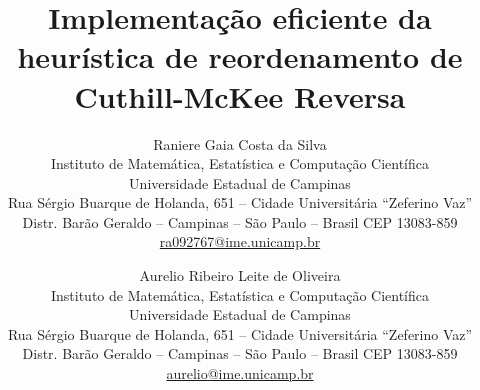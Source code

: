 \documentclass[11pt,a4paper]{article}
\begin{document}
\title{Implementa\c{c}\~{a}o eficiente da heur\'{i}stica de reordenamento de Cuthill-McKee Reversa}
\author{Raniere Gaia Costa da Silva \\
Instituto de Matemática, Estatística e Computação Científica \\
Universidade Estadual de Campinas \\
Rua Sérgio Buarque de Holanda, 651 – Cidade Universitária ``Zeferino Vaz'' \\
Distr. Barão Geraldo – Campinas – São Paulo – Brasil CEP 13083-859 \\
\url{ra092767@ime.unicamp.br}
\and Aurelio Ribeiro Leite de Oliveira \\
Instituto de Matemática, Estatística e Computação Científica \\
Universidade Estadual de Campinas \\
Rua Sérgio Buarque de Holanda, 651 – Cidade Universitária ``Zeferino Vaz'' \\
Distr. Barão Geraldo – Campinas – São Paulo – Brasil CEP 13083-859 \\
\url{aurelio@ime.unicamp.br}}
\date{}
\maketitle\thispagestyle{empty}


\newpage






\end{document}
